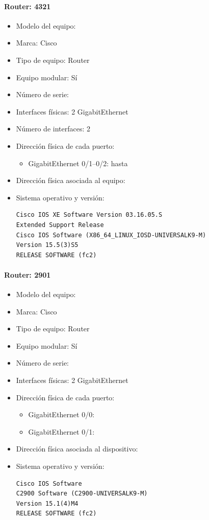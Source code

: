 \paragraph{Router: 4321}
\begin{itemize}
  \item Modelo del equipo: 
  \item Marca: Cisco
  \item Tipo de equipo: Router
  \item Equipo modular: Sí
  \item Número de serie: 
  \item Interfaces físicas: 2 GigabitEthernet
  \item Número de interfaces: 2
  \item Dirección física de cada puerto:
  \begin{itemize}
    \item GigabitEthernet 0/1–0/2:  hasta 
  \end{itemize}
  \item Dirección física asociada al equipo:
  \item Sistema operativo y versión:
\begin{verbatim}
Cisco IOS XE Software Version 03.16.05.S
Extended Support Release
Cisco IOS Software (X86_64_LINUX_IOSD-UNIVERSALK9-M)
Version 15.5(3)S5
RELEASE SOFTWARE (fc2)
\end{verbatim}
\end{itemize}

\paragraph{Router: 2901}
\begin{itemize}
  \item Modelo del equipo: 
  \item Marca: Cisco
  \item Tipo de equipo: Router
  \item Equipo modular: Sí
  \item Número de serie: 
  \item Interfaces físicas: 2 GigabitEthernet
  \item Dirección física de cada puerto:
  \begin{itemize}
    \item GigabitEthernet 0/0: 
    \item GigabitEthernet 0/1: 
  \end{itemize}
  \item Dirección física asociada al dispositivo:
  \item Sistema operativo y versión:
\begin{verbatim}
Cisco IOS Software
C2900 Software (C2900-UNIVERSALK9-M)
Version 15.1(4)M4
RELEASE SOFTWARE (fc2)
\end{verbatim}
\end{itemize}

